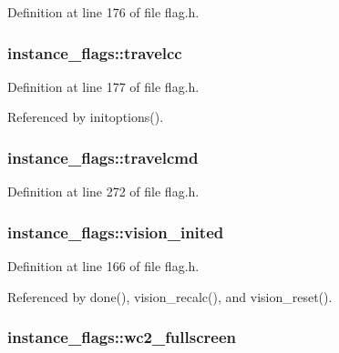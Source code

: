 Definition at line 176 of file flag.\+h.

\hypertarget{structinstance__flags_a7e1882dfd0c6cdb6460ef8e8d6769ee4}{
\subsubsection[{travelcc}]{ instance\+\_\+flags\+::travelcc}}\label{structinstance__flags_a7e1882dfd0c6cdb6460ef8e8d6769ee4}


Definition at line 177 of file flag.\+h.



Referenced by initoptions().

\hypertarget{structinstance__flags_a7c470716a5fefc018e79229f65f217a2}{
\subsubsection[{travelcmd}]{ instance\+\_\+flags\+::travelcmd}}\label{structinstance__flags_a7c470716a5fefc018e79229f65f217a2}


Definition at line 272 of file flag.\+h.

\hypertarget{structinstance__flags_a61d68e3b4f194bab370620301c0cb7d9}{
\subsubsection[{vision\+\_\+inited}]{ instance\+\_\+flags\+::vision\+\_\+inited}}\label{structinstance__flags_a61d68e3b4f194bab370620301c0cb7d9}


Definition at line 166 of file flag.\+h.



Referenced by done(), vision\+\_\+recalc(), and vision\+\_\+reset().

\hypertarget{structinstance__flags_a638a1aa6b9b6e53d7089d1baa3a1b05a}{
\subsubsection[{wc2\+\_\+fullscreen}]{ instance\+\_\+flags\+::wc2\+\_\+fullscreen}}\label{structinstance__flags_a638a1aa6b9b6e53d7089d1baa3a1b05a}



